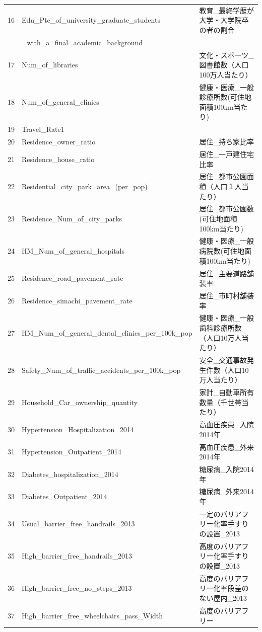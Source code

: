 \begin{table}[ht]
\begin{tabular}{rll}
  16 & Edu\_Ptc\_of\_university\_graduate\_students & 教育\_最終学歴が大学・大学院卒の者の割合 \\
   & \_with\_a\_final\_academic\_background & \\
  17 & Num\_of\_libraries & 文化・スポーツ\_図書館数（人口100万人当たり） \\
  18 & Num\_of\_general\_clinics & 健康・医療\_一般診療所数(可住地面積100km当たり) \\
  19 & Travel\_Rate1 &  \\
  20 & Residence\_owner\_ratio & 居住\_持ち家比率 \\
  21 & Residence\_house\_ratio & 居住\_一戸建住宅比率 \\
  22 & Residential\_city\_park\_area\_(per\_pop) & 居住\_都市公園面積（人口１人当たり） \\
  23 & Residence\_Num\_of\_city\_parks & 居住\_都市公園数(可住地面積100km当たり) \\
  24 & HM\_Num\_of\_general\_hospitals & 健康・医療\_一般病院数(可住地面積100km当たり) \\
  25 & Residence\_road\_pavement\_rate & 居住\_主要道路舗装率 \\
  26 & Residence\_simachi\_pavement\_rate & 居住\_市町村舗装率 \\
  27 & HM\_Num\_of\_general\_dental\_clinics\_per\_100k\_pop & 健康・医療\_一般歯科診療所数（人口10万人当たり） \\
  28 & Safety\_Num\_of\_traffic\_accidents\_per\_100k\_pop & 安全\_交通事故発生件数（人口10万人当たり） \\
  29 & Household\_Car\_ownership\_quantity & 家計\_自動車所有数量（千世帯当たり） \\
  30 & Hypertension\_Hospitalization\_2014 & 高血圧疾患\_入院2014年 \\
  31 & Hypertension\_Outpatient\_2014 & 高血圧疾患\_外来2014年 \\
  32 & Diabetes\_hospitalization\_2014 & 糖尿病\_入院2014年 \\
  33 & Diabetes\_Outpatient\_2014 & 糖尿病\_外来2014年 \\
  34 & Usual\_barrier\_free\_handrails\_2013 & 一定のバリアフリー化率手すりの設置\_2013 \\
  35 & High\_barrier\_free\_handrails\_2013 & 高度のバリアフリー化率手すりの設置\_2013 \\
  36 & High\_barrier\_free\_no\_steps\_2013 & 高度のバリアフリー化率段差のない屋内\_2013 \\
  37 & High\_barrier\_free\_wheelchairs\_pass\_Width & 高度のバリアフリー \\

\end{tabular}
\end{table}
